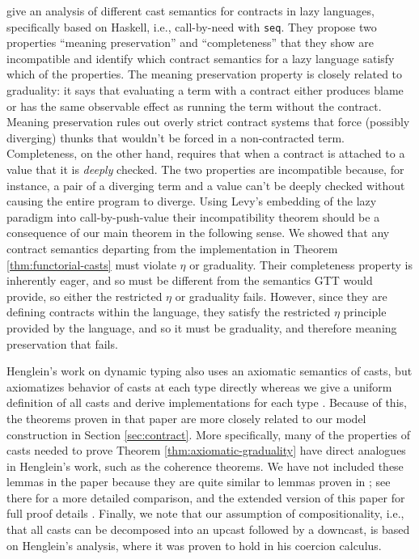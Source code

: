 \documentclass[acmsmall,nonacm]{acmart}
\newif\iflong
\newcommand{\seq}{\texttt{seq}}
\begin{document}
{\citet{Degen2012TheIO} give an analysis of different cast semantics
for contracts in lazy languages, specifically based on Haskell, i.e., 
call-by-need with \seq.
%
They propose two properties ``meaning preservation'' and
``completeness'' that they show are incompatible and identify which
contract semantics for a lazy language satisfy which of the
properties.
%
The meaning preservation property is closely related to graduality: it
says that evaluating a term with a contract either produces blame or
has the same observable effect as running the term without the
contract.
%
Meaning preservation rules out overly strict contract systems that
force (possibly diverging) thunks that wouldn't be forced in a
non-contracted term.
%
Completeness, on the other hand, requires that when a contract is
attached to a value that it is \emph{deeply} checked.
%
The two properties are incompatible because, for instance, a pair of a
diverging term and a value can't be deeply checked without causing the
entire program to diverge.
%
Using Levy's embedding of the lazy paradigm into call-by-push-value
their incompatibility theorem should be a consequence of our main
theorem in the following sense.
%
We showed that any contract semantics departing from the
implementation in Theorem \ref{thm:functorial-casts} must violate
$\eta$ or graduality.
%
Their completeness property is inherently eager, and so must be
different from the semantics GTT would provide, so either the
restricted $\eta$ or graduality fails.
%
However, since they are defining contracts within the language, they
satisfy the restricted $\eta$ principle provided by the language, and
so it must be graduality, and therefore meaning preservation that
fails.

\iflong\paragraph{Axiomatic Casts}\fi

Henglein's work on dynamic typing also uses an axiomatic semantics of
casts, but axiomatizes behavior of casts at each type directly whereas
we give a uniform definition of all casts and derive implementations
for each type \cite{henglein94:dynamic-typing}.
%
Because of this, the theorems proven in that paper are more closely
related to our model construction in Section
\ref{sec:contract}.
%
More specifically, many of the properties of casts needed to prove
Theorem \ref{thm:axiomatic-graduality} have direct analogues
in Henglein's work, such as the coherence theorems.
%
We have not included these lemmas in the paper because they are quite
similar to lemmas proven in \citet{newahmed18}; see there for a more
detailed comparison, and the extended version of this paper for full proof details \citep{newlicataahmed19:extended}.
%
Finally, we note that our assumption of compositionality, i.e., that
all casts can be decomposed into an upcast followed by a downcast, is
based on Henglein's analysis, where it was proven to hold in his
coercion calculus.

}
\end{document}
